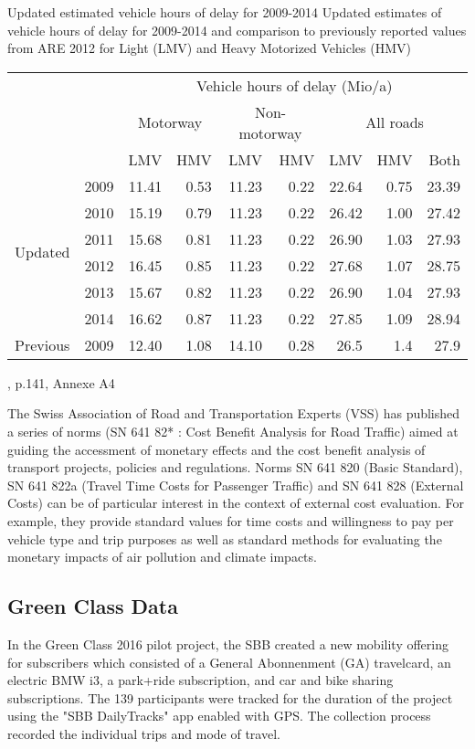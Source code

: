 \createtable%
{Updated estimated vehicle hours of delay for 2009-2014}%
{Updated estimates of vehicle hours of delay for 2009-2014 and comparison to previously reported values from ARE 2012 for Light (LMV) and Heavy Motorized Vehicles (HMV)}%
{\label{tab:vehHoursDelayMkInfras}}%
{%
  \begin{tabular}[c]{lrrrrrrrr}
    \toprule
    \multirow{3}{*}{} & & \multicolumn{7}{c}{Vehicle hours of delay (Mio/a)}\\ 
    & & \multicolumn{2}{c}{Motorway} & \multicolumn{2}{c}{Non-motorway} & \multicolumn{3}{c}{All roads}\\
    & &  LMV & HMV & LMV & HMV & LMV & HMV & Both\\
    \midrule
    \multirow{6}{*}{Updated}
    & 2009 & 11.41 & 0.53 & 11.23 & 0.22 & 22.64 & 0.75 & 23.39 \\
    & 2010 & 15.19 & 0.79 & 11.23 & 0.22 & 26.42 & 1.00 & 27.42 \\
    & 2011 & 15.68 & 0.81 & 11.23 & 0.22 & 26.90 & 1.03 & 27.93 \\
    & 2012 & 16.45 & 0.85 & 11.23 & 0.22 & 27.68 & 1.07 & 28.75 \\
    & 2013 & 15.67 & 0.82 & 11.23 & 0.22 & 26.90 & 1.04 & 27.93 \\
    & 2014 & 16.62 & 0.87 & 11.23 & 0.22 & 27.85 & 1.09 & 28.94 \\
    \midrule
    Previous & 2009 & 12.40 & 1.08 & 14.10 & 0.28 & 26.5 & 1.4 & 27.9 \\
    \bottomrule
  \end{tabular}
}%
{\citet{mkinfras2016staukosten}, p.141, Annexe A4}

The Swiss Association of Road and Transportation Experts (VSS) has published a series of norms (SN 641 82* : Cost Benefit Analysis
for Road Traffic) aimed at guiding the accessment of monetary effects and the cost benefit analysis of transport projects, policies and regulations.
Norms SN 641 820 (Basic Standard), SN 641 822a (Travel Time Costs for Passenger Traffic) and SN 641 828 (External Costs) can be of particular interest in the context of external cost evaluation.
For example, they provide standard values for time costs and willingness to pay per vehicle type and trip purposes as well as standard methods for evaluating the monetary impacts of air pollution and climate impacts.
 

\subsection{Green Class Data}
In the Green Class 2016 pilot project, the SBB created a new mobility offering for subscribers which consisted of a General Abonnenment (GA) travelcard, an electric BMW i3, a park+ride subscription, and car and bike sharing subscriptions.
The 139 participants were tracked for the duration of the project using the "SBB DailyTracks" app enabled with GPS.
The collection process recorded the individual trips and mode of travel.  

